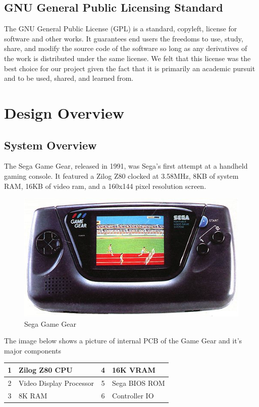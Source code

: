 \documentclass{article}
\begin{document}
\subsection{GNU General Public Licensing Standard}

The GNU General Public License (GPL) \cite{gpl} is a standard, copyleft,
license for software and other works.  It guarantees end users the freedoms to
use, study, share, and modify the source code of the software so long as any
derivatives of the work is distributed under the same license. We felt that
this license was the best choice for our project given the fact that it is
primarily an academic pursuit and to be used, shared, and learned from.

\section{Design Overview}

\subsection{System Overview}

The Sega Game Gear, released in 1991, was Sega's first attempt at a handheld
gaming console. It featured a Zilog Z80 clocked at 3.58MHz, 8KB of system RAM,
16KB of video ram, and a 160x144 pixel resolution screen.

\begin{figure}[H]
\centering
\includegraphics[scale=0.4]{../images/gamegear.png}
\caption{Sega Game Gear \protect\cite{gg}}
\label{fig:gg}
\end{figure}

The image below shows a picture of internal PCB of the Game Gear and it's major
components

\begin{table}[H]
    \centering
    \begin{tabular}{|c|l|c|l|}
        \hline
        1 & Zilog Z80 CPU           & 4 & 16K VRAM      \\ \hline
        2 & Video Display Processor & 5 & Sega BIOS ROM \\ \hline
        3 & 8K RAM                  & 6 & Controller IO \\
        \hline
    \end{tabular}
\end{table}
\end{document}
